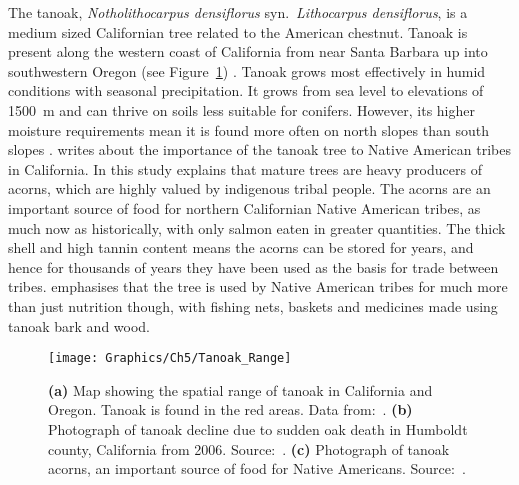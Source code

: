 The tanoak, \textit{Notholithocarpus densiflorus} syn.~\textit{Lithocarpus densiflorus}, is a medium sized Californian tree related to the American chestnut. Tanoak is present along the western coast of California from near Santa Barbara up into southwestern Oregon (see Figure~\ref{fig:ch5:tanoak_range}) \citep{tappeiner_lithocarpus_1990}. Tanoak grows most effectively in humid conditions with seasonal precipitation. It grows from sea level to elevations of \SI{1500}{\meter} and can thrive on soils less suitable for conifers. However, its higher moisture requirements mean it is found more often on north slopes than south slopes \citep{tappeiner_lithocarpus_1990}. \citet{bowcutt_tanoak_2013} writes about the importance of the tanoak tree to Native American tribes in California. In this study \citeauthor{bowcutt_tanoak_2013} explains that mature trees are heavy producers of acorns, which are highly valued by indigenous tribal people. The acorns are an important source of food for northern Californian Native American tribes, as much now as historically, with only salmon eaten in greater quantities. The thick shell and high tannin content means the acorns can be stored for years, and hence for thousands of years they have been used as the basis for trade between tribes. \citeauthor{bowcutt_tanoak_2013} emphasises that the tree is used by Native American tribes for much more than just nutrition though, with fishing nets, baskets and medicines made using tanoak bark and wood.

\begin{figure}
    \begin{center}
        \texttt{[image: Graphics/Ch5/Tanoak\_Range]}
        \caption[The tanoak tree: pictures and map of spatial range]{\textbf{(a)} Map showing the spatial range of tanoak in California and Oregon. Tanoak is found in the red areas. Data from:~\citet{plant_maps}. \textbf{(b)} Photograph of tanoak decline due to sudden oak death in Humboldt county, California from 2006. Source:~\citet{tanoak_pict2}. \textbf{(c)} Photograph of tanoak acorns, an important source of food for Native Americans. Source:~\citet{tanoak_pict}.\label{fig:ch5:tanoak_range}}
    \end{center}
\end{figure}

